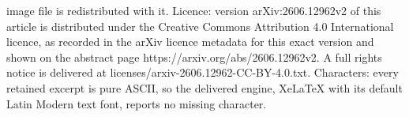 \documentclass[10pt,a4paper]{amsart}
\def\PP{\mathbb{P}}
\def\T{\mathcal{T}}
\def\h{\hat}
\def\uhr{\upharpoonright}
\newcommand{\NN}[0]{\mathbb{N}}
\newcommand{\RCA}[0]{\mathsf{RCA}}
\newcommand{\WSub}{\mathsf{WSub}}
\newcommand{\qvdash}{\operatorname{{?}{\vdash}}}
\begin{document}
image file is redistributed with it. Licence: version arXiv:2606.12962v2 of this article is distributed under the Creative Commons Attribution 4.0 International licence, as recorded in the arXiv licence metadata for this exact version and shown on the abstract page https://arxiv.org/abs/2606.12962v2. A full rights notice is delivered at licenses/arxiv-2606.12962-CC-BY-4.0.txt. Characters: every retained excerpt is pure ASCII, so the delivered engine, XeLaTeX with its default Latin Modern text font, reports no missing character.

\end{document}
